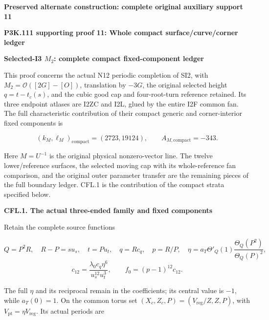 \par\bigskip\noindent\textbf{Preserved alternate construction: complete original auxiliary support 11}\par
\par\bigskip\noindent\textbf{P3K.111 supporting proof 11: Whole compact surface/curve/corner ledger}\par\nobreak
\par

\medskip\noindent\textbf{Selected-I3 \(M_{2}\): complete compact fixed-component ledger}

\par\nobreak

This proof concerns the actual N12 periodic completion of SI2, with
\(M_2=\mathcal O([2G]-[O])\), translation by \(-3G\), the original
selected height \(q=t-t_c(s)\), and the cubic good cap and four-root-turn
reference retained. Its three endpoint atlases are I2ZC and I2L, glued
by the entire I2F common fan. The full characteristic contribution
of their compact generic and corner-interior fixed components is

\[
                  (k_M,\ell_M)_{\mathrm{compact}}=(2723,19124),
 \qquad A_{M,\mathrm{compact}}=-343.
 \tag{CFL.1}
\]

Here \(M=U^{-1}\) is the original physical nonzero-vector line.
The twelve lower/reference surfaces, the selected moving cap with
its whole-reference fan comparison, and the original outer
parameter transfer are the remaining pieces of the full boundary
ledger. CFL.1 is the contribution of the compact strata specified
below.

\par

\medskip\noindent\textbf{CFL.1. The actual three-ended family and fixed components}

\par\nobreak

Retain the complete source functions

\[
 Q=P^2R,\quad R-P=s u_s,\quad t=P u_t,\quad q=R c_q,
 \quad p=R/P,\quad
 \eta=a_T\Theta'_Q(1)\frac{\Theta_Q(P^2)}{\Theta_Q(P)^2},
\]
\[
 c_{12}=\frac{\lambda_0c_q\eta^6}{u_s^{12}u_t^3},
 \qquad f_0=(p-1)^{12}c_{12}.
 \tag{CFL.2}
\]

The full \(\eta\) and its reciprocal remain in the coefficients;
its central value is \(-1\), while \(a_T(0)=1\). On the common
torus set
\((X_c,Z_c,P)=(V_{\mathrm{reg}}/Z,Z,P)\), with
\(V_{\mathrm{pt}}=\eta V_{\mathrm{reg}}\). Its actual periods are

